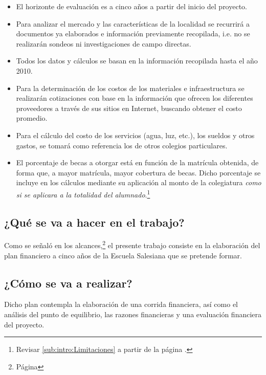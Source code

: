 \begin{itemize}
	\item El horizonte de evaluación es a cinco años a partir del inicio del proyecto. %
	\item Para analizar el mercado y las características de la localidad se recurrirá a documentos ya elaborados e información previamente recopilada, i.e. no se realizarán sondeos ni investigaciones de campo directas. %
	\item Todos los datos y cálculos se basan en la información recopilada hasta el año 2010. %
	\item Para la determinación de los costos de los materiales e infraestructura se realizarán cotizaciones con base en la información que ofrecen los diferentes proveedores a través de sus sitios en Internet, buscando obtener el costo promedio.
	\item Para el cálculo del costo de los servicios (agua, luz, etc.), los sueldos y otros gastos, se tomará como referencia los de otros colegios particulares.
	\item El porcentaje de becas a otorgar está en función de la matrícula obtenida, de forma que, a mayor matrícula, mayor cobertura de becas. Dicho porcentaje se incluye en los cálculos mediante su aplicación al monto de la colegiatura \emph{como si se aplicara a la totalidad del alumnado}.\footnote{Revisar \ref{sub:intro:Limitaciones} a partir de la página \pageref{sub:intro:Limitaciones}.}
\end{itemize}

\subsection{¿Qué se va a hacer en el trabajo?}

Como se señaló en los alcances,\footnote{Página \pageref{sub:intro:Alcances}} el presente trabajo consiste en la elaboración del plan financiero a cinco años de la Escuela Salesiana que se pretende formar.

\subsection{¿Cómo se va a realizar?}

Dicho plan contempla la elaboración de una corrida financiera, así como el análisis del punto de equilibrio, las razones financieras y una evaluación financiera del proyecto.

